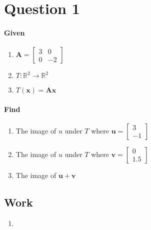 \documentclass{article}
\begin{document}
\section{Question 1}
    \paragraph{Given}
        \begin{enumerate}
            \item $\mathbf{A} = \begin{bmatrix}3 & 0\\0 & -2\end{bmatrix}$
            \item $T: \mathbb{R}^2 \rightarrow \mathbb{R}^2 $ 
            \item$T(\mathbf{x})=\mathbf{A}\mathbf{x}$
        \end{enumerate}
    \paragraph{Find}
        \begin{enumerate}
            \item 
                The image of $u$ under $T$ where
                $\mathbf{u} = \begin{bmatrix}3\\-1\end{bmatrix}$
            \item 
                The image of $u$ under $T$ where
                $\mathbf{v} = \begin{bmatrix}0\\1.5\end{bmatrix}$
            \item The image of $\mathbf{u} + \mathbf{v}$
        \end{enumerate}
    \subsection{Work}
        \begin{enumerate}
            \item 
                
        \end{enumerate}



        
    
\end{document}
